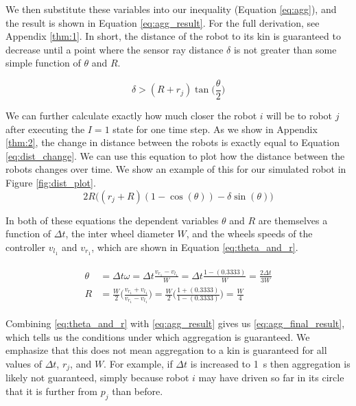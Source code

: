 \documentclass[conference]{IEEEtran}
\begin{document}
    We then substitute these variables into our inequality (Equation \ref{eq:agg}), and the result is shown in Equation \ref{eq:agg_result}. For the full derivation, see Appendix \ref{thm:1}. In short, the distance of the robot to its kin is guaranteed to decrease until a point where the sensor ray distance $\delta$ is not greater than some simple function of $\theta$ and $R$.

    \begin{equation} \label{eq:agg_result}
      \delta > (R + r_j)\tan\bigg(\frac{\theta}{2}\bigg)
    \end{equation}

    We can further calculate exactly how much closer the robot $i$ will be to robot $j$ after executing the $I=1$ state for one time step. As we show in Appendix \ref{thm:2}, the change in distance between the robots is exactly equal to Equation \ref{eq:dist_change}. We can use this equation to plot how the distance between the robots changes over time. We show an example of this for our simulated robot in Figure \ref{fig:dist_plot}.
    \begin{equation} \label{eq:dist_change}
      2R\big((r_j + R)(1 - \cos(\theta))-\delta\sin(\theta)\big)
    \end{equation}

    In both of these equations the dependent variables $\theta$ and $R$ are themselves a function of $\Delta t$, the inter wheel diameter $W$, and the wheels speeds of the controller $v_{l_1}$ and $v_{r_1}$, which are shown in Equation \ref{eq:theta_and_r}.

    \begin{align}
      \begin{split} \label{eq:theta_and_r}
        \theta &= \Delta t\omega = \Delta t \frac{v_{r_1} - v_{l_1}}{W} = \Delta t \frac{1 - (0.3333)}{W} = \frac{2\Delta t}{3W} \\
        R &= \frac{W}{2}\bigg(\frac{v_{r_1} + v_{l_1}}{v_{r_1} - v_{l_1}}\bigg) = \frac{W}{2}\bigg(\frac{1 + (0.3333)}{1 - (0.3333)}\bigg) = \frac{W}{4}
      \end{split}
    \end{align}

    Combining \ref{eq:theta_and_r} with \ref{eq:agg_result} gives us \ref{eq:agg_final_result}, which tells us the conditions under which aggregation is guaranteed. We emphasize that this does not mean aggregation to a kin is guaranteed for all values of $\Delta t$, $r_j$, and $W$. For example, if $\Delta t$ is increased to \SI{1}{\second} then aggregation is likely not guaranteed, simply because robot $i$ may have driven so far in its circle that it is further from $p_j$ than before.
\end{document}
